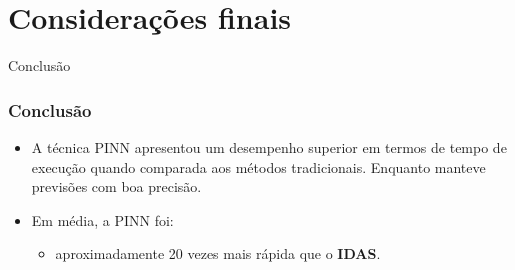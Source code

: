 \section{Considerações finais}

\begin{frame}{Conclusão}
    \frametitle{Conclusão}
    \vspace{-0.2 cm}
    \begin{itemize}
        \item \small A técnica PINN apresentou um desempenho superior em termos de tempo de execução quando comparada aos métodos tradicionais. Enquanto manteve previsões com boa precisão. 
        \item \small Em média, a PINN foi:
        \begin{itemize}
            \item aproximadamente 20 vezes mais rápida que o \textbf{IDAS}.
        \end{itemize}
    \end{itemize}
\end{frame}